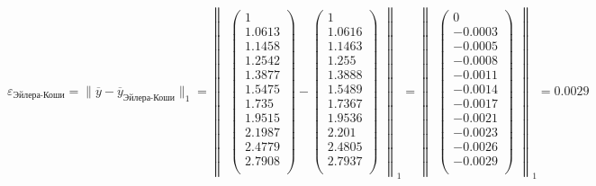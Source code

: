 \documentclass[10pt, a4paper]{scrartcl}
\begin{document}
\(\displaystyle \varepsilon_{\text{Эйлера-Коши}} = \parallel \overline{y} - \overline{y}_{\text{Эйлера-Коши}} \parallel _1 = \begin{Vmatrix} \begin{pmatrix} 1\\ 1.0613\\ 1.1458\\ 1.2542\\ 1.3877\\ 1.5475\\ 1.735\\ 1.9515\\ 2.1987\\ 2.4779\\ 2.7908\\ \end{pmatrix} - \begin{pmatrix} 1\\ 1.0616\\ 1.1463\\ 1.255\\ 1.3888\\ 1.5489\\ 1.7367\\ 1.9536\\ 2.201\\ 2.4805\\ 2.7937\\ \end{pmatrix} \end{Vmatrix} _1 = \begin{Vmatrix} \begin{pmatrix} 0\\ -0.0003\\ -0.0005\\ -0.0008\\ -0.0011\\ -0.0014\\ -0.0017\\ -0.0021\\ -0.0023\\ -0.0026\\ -0.0029\\ \end{pmatrix}\end{Vmatrix} _1 = 0.0029\)
\end{document}
